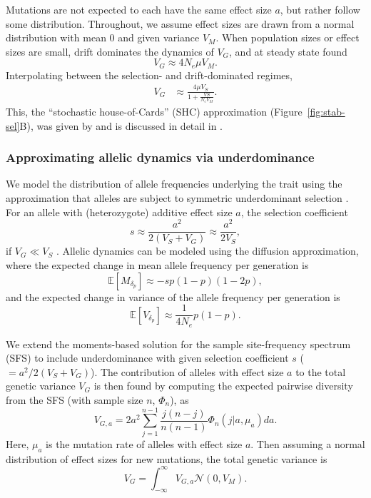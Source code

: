 \documentclass{article}
\newcommand{\E}{\mathbb{E}}
\begin{document}
Mutations are not expected to each have the same effect size $a$, but rather
follow some distribution. Throughout, we assume effect sizes are drawn from a
normal distribution with mean 0 and given variance $V_M$. When population sizes
or effect sizes are small, drift dominates the dynamics of $V_G$, and at steady
state \citet{lande1976natural} found \[V_G \approx 4 N_e \mu V_M.\]
Interpolating between the selection- and drift-dominated regimes,
\begin{align}\label{eq:SHC}
    V_G & \approx \frac{4 \mu V_S}{1 + \frac{VS}{N_e V_M}}.
\end{align}
This, the ``stochastic
house-of-Cards'' (SHC) approximation (Figure~\ref{fig:stab-sel}B), was given by
\citet{burger1989much} and is discussed in detail in \citet[][Ch.
28]{walsh2018evolution}.

\subsubsection*{Approximating allelic dynamics via underdominance}

We model the distribution of allele frequencies underlying the trait using
the approximation that alleles are subject to symmetric underdominant
selection \citep{robertson1956effect,keightley1988quantitative}.
For an allele with (heterozygote) additive effect size $a$,
the selection coefficient
\[s\approx \frac{a^2}{2(V_S + V_G)} \approx \frac{a^2}{2V_S},\]
if $V_G \ll V_S$ \citep[e.g.,][]{simons2018population}. Allelic dynamics can
be modeled using the diffusion approximation, where the expected change
in mean allele frequency per generation is
\[\E[M_{\delta_p}] \approx -s p(1-p)(1-2p),\]
and the expected change in variance of the allele frequency per generation is
\[\E[V_{\delta_p}] \approx \frac{1}{4N_e}p(1-p).\]

We extend the moments-based solution for the sample site-frequency spectrum
(SFS) \citep{jouganous2017inferring} to include underdominance with given
selection coefficient $s$ (\(=a^2/2(V_S+V_G)\)). The contribution of alleles
with effect size $a$ to the total genetic variance $V_G$ is then found by
computing the expected pairwise diversity from the SFS (with sample size $n$,
$\Phi_n$), as
\[V_{G,a} = 2a^2\sum_{j=1}^{n-1}\frac{j(n-j)}{n(n-1)}\Phi_n(j|a,\mu_a)da.\]
Here, $\mu_a$ is the mutation rate of alleles with effect size $a$. Then
assuming a normal distribution of effect sizes for new mutations, the total
genetic variance is
\[V_G=\int_{-\infty}^\infty V_{G,a}\mathcal{N}(0,V_M).\]
\end{document}
